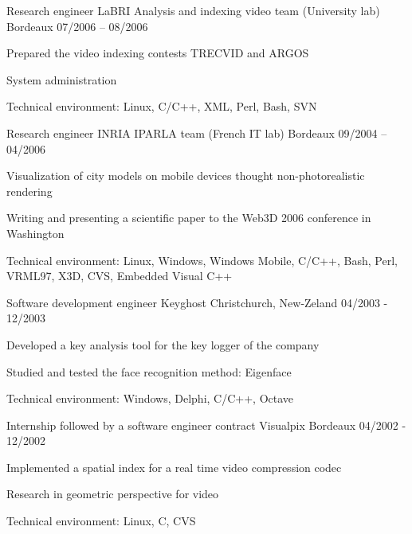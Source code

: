 \begin{cventries}
  \cventry
    {Research engineer}
    {LaBRI Analysis and indexing video team (University lab)}
    {Bordeaux}
    {07/2006 – 08/2006}
    {
      \begin{cvitems}
        \item {Prepared the video indexing contests TRECVID and ARGOS}
        \item {System administration}
        \item {Technical environment: Linux, C/C++, XML, Perl, Bash, SVN}
      \end{cvitems}
    }

  \cventry
    {Research engineer}
    {INRIA IPARLA team (French IT lab)}
    {Bordeaux}
    {09/2004 – 04/2006}
    {
      \begin{cvitems}
        \item {Visualization of city models on mobile devices thought
            non-photorealistic rendering}
        \item {Writing and presenting a scientific paper to the Web3D 2006
            conference in Washington}
        \item {Technical environment: Linux, Windows, Windows Mobile, C/C++,
            Bash, Perl, VRML97, X3D, CVS, Embedded Visual C++}
      \end{cvitems}
    }

  \cventry
    {Software development engineer}
    {Keyghost}
    {Christchurch, New-Zeland}
    {04/2003 - 12/2003}
    {
      \begin{cvitems}
        \item {Developed a key analysis tool for the key logger of the company}
        \item {Studied and tested the face recognition method: Eigenface}
		\item {Technical environment: Windows, Delphi, C/C++, Octave}
      \end{cvitems}
    }

  \cventry
    {Internship followed by a software engineer contract}
    {Visualpix}
    {Bordeaux}
    {04/2002 - 12/2002}
    {
      \begin{cvitems}
        \item {Implemented a spatial index for a real time video compression
            codec}
        \item {Research in geometric perspective for video}
		\item {Technical environment: Linux, C, CVS}
      \end{cvitems}
    }


\end{cventries}
